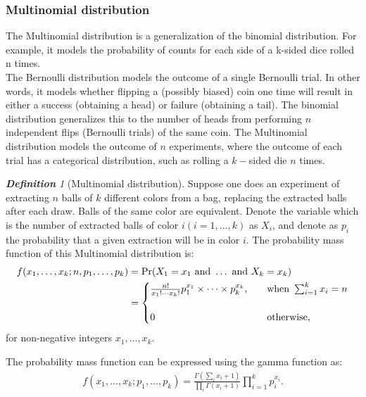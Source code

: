\documentclass[12pt,oneside,a4paper]{book}
\theoremstyle{definition}
\theoremstyle{remark}
\newtheorem{defn}{\bf Definition}[subsection]
\begin{document}
				\subsubsection{Multinomial distribution}
					The Multinomial distribution is a generalization of the binomial distribution. For example, it models the probability of counts for each side of a k-sided dice rolled n times.\\
					The Bernoulli distribution models the outcome of a single Bernoulli trial. In other words, it models whether flipping a (possibly biased) coin one time will result in either a success (obtaining a head) or failure (obtaining a tail). The binomial distribution generalizes this to the number of heads from performing $n$ independent flips (Bernoulli trials) of the same coin. The Multinomial distribution models the outcome of $n$ experiments, where the outcome of each trial has a categorical distribution, such as rolling a $k-$sided die $n$ times.

					\begin{defn}[Multinomial distribution]
						Suppose one does an experiment of extracting $n$ balls of $k$ different colors from a bag, replacing the extracted balls after each draw. Balls of the same color are equivalent. Denote the variable which is the number of extracted balls of color $i (i = 1, ..., k)$ as $X_i$, and denote as $p_i$ the probability that a given extraction will be in color $i$. The probability mass function of this Multinomial distribution is:
							\begin{equation}
									\begin{aligned}
										f(x_{1},\ldots ,x_{k};n,p_{1},\ldots ,p_{k})
											&= \Pr(X_{1}=x_{1}{\text{ and }}\dots {\text{ and }}X_{k}=x_{k})\\
											&={
												\begin{cases}{
														{n! \over x_{1}!\cdots x_{k}!} p_{1}^{x_{1}}\times \cdots \times p_{k}^{x_{k}}},\quad &{\text{when }}\sum _{i=1}^{k}x_{i}=n\\\\
														0	& {\text{otherwise,}}
												\end{cases}
											   }
									\end{aligned}
							\end{equation}
							for non-negative integers $x_1, \ldots, x_k$. \cite{berger2001statistical}

							The probability mass function can be expressed using the gamma function as: \cite{johnson1997multivariate}
								\begin{equation}
									\begin{aligned}
										 f(x_{1},\dots ,x_{k};p_{1},\ldots ,p_{k})={\frac {\Gamma (\sum _{i}x_{i}+1)}{\prod _{i}\Gamma (x_{i}+1)}}\prod _{i=1}^{k}p_{i}^{x_{i}}.
									\end{aligned}
								\end{equation}
					\end{defn}
\end{document}
